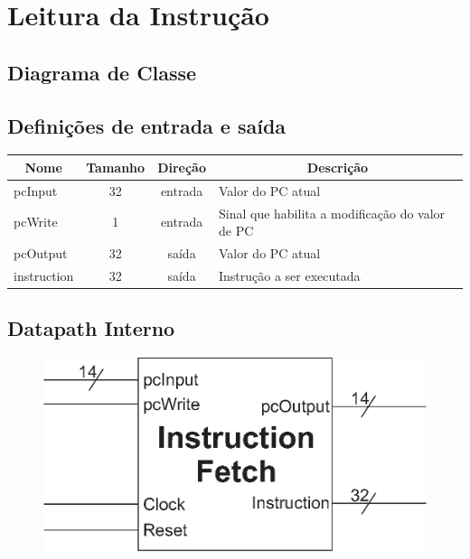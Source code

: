 \section{Leitura da Instrução}
	\subsection{Diagrama de Classe}
  \begin{figure}[H]
    
  \end{figure}
		
		\subsection{Definições de entrada e saída}
		
	\begin{center}
		\begin{longtable}[pos]{| l | c | c | m{7cm} |} \hline
			\multicolumn{1}{|c|}{\cellcolor[gray]{0.9}\textbf{Nome}} & 
			\multicolumn{1}{c|}{\cellcolor[gray]{0.9}\textbf{Tamanho}} & 
			\multicolumn{1}{c|}{\cellcolor[gray]{0.9}\textbf{Direção}} &
			\multicolumn{1}{c|}{\cellcolor[gray]{0.9}\textbf{Descrição}} \\ \hline
			\endhead
			\hline
			\endlastfoot
			pcInput & 32 & entrada & Valor do PC atual\\ \hline
			pcWrite & 1 & entrada & Sinal que habilita a modificação do valor de PC \\ \hline
			pcOutput & 32 & saída & Valor do PC atual \\ \hline
			instruction & 32 & saída & Instrução a ser executada \\ \hline
			
		\end{longtable}
	\end{center}
	
	\subsection{Datapath Interno}
	\begin{figure}
		\begin{center}
		\includegraphics[scale=0.5]{./datapath/Graphic1.eps}
		\end{center}
	\end{figure}